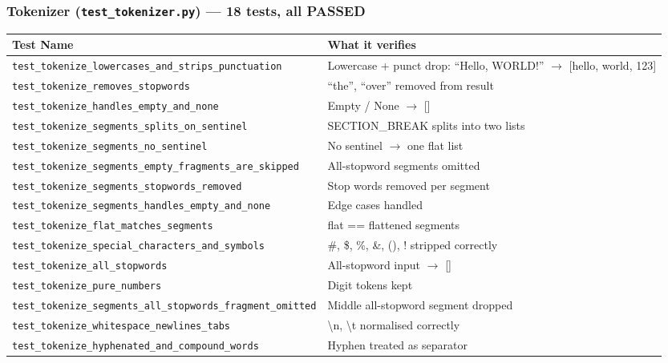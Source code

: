 \documentclass[12pt]{article}
\begin{document}
\subsubsection*{Tokenizer (\texttt{test\_tokenizer.py}) --- 18 tests, all PASSED}
\begin{table}[H]
\centering
\footnotesize
\begin{tabular}{|p{7.2cm}|p{7.2cm}|}
\hline
\textbf{Test Name} & \textbf{What it verifies} \\
\hline
\texttt{test\_tokenize\_lowercases\_and\_strips\_punctuation}         & Lowercase + punct drop: ``Hello, WORLD!'' $\to$ [hello, world, 123] \\
\texttt{test\_tokenize\_removes\_stopwords}                           & ``the'', ``over'' removed from result \\
\texttt{test\_tokenize\_handles\_empty\_and\_none}                   & Empty / None $\to$ [] \\
\texttt{test\_tokenize\_segments\_splits\_on\_sentinel}               & SECTION\_BREAK splits into two lists \\
\texttt{test\_tokenize\_segments\_no\_sentinel}                       & No sentinel $\to$ one flat list \\
\texttt{test\_tokenize\_segments\_empty\_fragments\_are\_skipped}     & All-stopword segments omitted \\
\texttt{test\_tokenize\_segments\_stopwords\_removed}                 & Stop words removed per segment \\
\texttt{test\_tokenize\_segments\_handles\_empty\_and\_none}          & Edge cases handled \\
\texttt{test\_tokenize\_flat\_matches\_segments}                      & flat == flattened segments \\
\texttt{test\_tokenize\_special\_characters\_and\_symbols}            & \#, \$, \%, \&, (), ! stripped correctly \\
\texttt{test\_tokenize\_all\_stopwords}                               & All-stopword input $\to$ [] \\
\texttt{test\_tokenize\_pure\_numbers}                                & Digit tokens kept \\
\texttt{test\_tokenize\_segments\_all\_stopwords\_fragment\_omitted}  & Middle all-stopword segment dropped \\
\texttt{test\_tokenize\_whitespace\_newlines\_tabs}                   & \textbackslash{}n, \textbackslash{}t normalised correctly \\
\texttt{test\_tokenize\_hyphenated\_and\_compound\_words}             & Hyphen treated as separator \\
\hline
\end{tabular}
\end{table}
\end{document}
